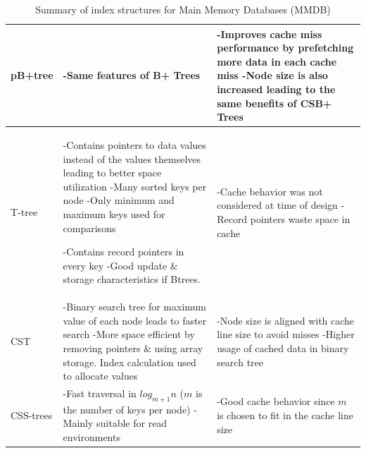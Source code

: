 \documentclass[12pt,a4paper]{article}
\begin{document}
\begin{table}[t!]
{\begin{tabular}{p{2.2cm}|p{6cm}|p{6cm}}
pB+tree & 
-Same features of B+ Trees
             &
-Improves cache miss performance by prefetching more data in each cache miss \linebreak \linebreak
-Node size is also increased leading to the same benefits of CSB+ Trees\\
\hline
T-tree &  
-Contains pointers to data values instead of the values themselves leading to better space utilization \linebreak \linebreak
-Many sorted keys per node \linebreak \linebreak
-Only minimum and maximum keys used for comparisons \linebreak \linebreak
\raggedright -Contains record pointers in every key \linebreak \linebreak
-Good update \& storage characteristics if Btrees.
             &
-Cache behavior was not considered at time of design \linebreak \linebreak
-Record pointers waste space in cache\\
\hline
CST & 
-Binary search tree for maximum value of each node leads to faster search \linebreak \linebreak
-More space efficient by removing pointers \& using array storage. Index calculation used to allocate values &
-Node size is aligned with cache line size to avoid misses \linebreak \linebreak
-Higher usage of cached data in binary search tree\\
\hline
CSS-trees & 
-Fast traversal in $log_{m+1}n$ ($m$ is the number of keys per node) \linebreak \linebreak
-Mainly suitable for read environments &
-Good cache behavior since $m$ is chosen to fit in the cache line size\\

\end{tabular}
}
\caption{Summary of index structures for Main Memory Databases (MMDB)}
\label{tab:mmdbindexsumm}
\end{table}
\end{document}
